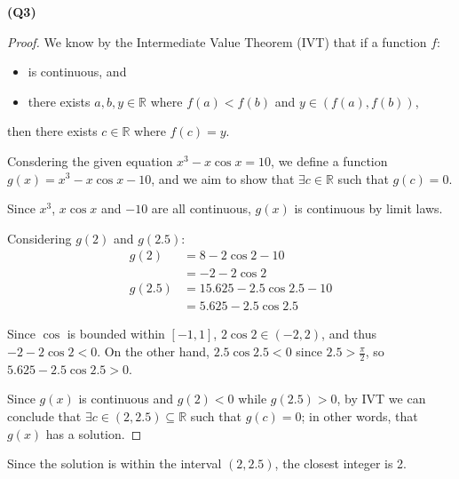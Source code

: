 \documentclass[12pt, a4paper]{article}
\newcommand{\R}{\mathbb{R}}
\begin{document}
\textbf{(Q3)} 
\begin{proof}
    We know by the Intermediate Value Theorem (IVT) that if a function $f$:
    \begin{itemize}
        \item is continuous, and
        \item there exists $a,b, y\in \R$ where $f(a) < f(b)$ and $y \in (f(a), f(b))$,
    \end{itemize}

    then there exists $c \in \R$ where $f(c) = y$.

    Consdering the given equation $x^3 - x \cos x = 10$, we define a function
    $g(x) = x^3 - x \cos x - 10$, and we aim to show that $\exists c \in \R$ such that $g(c) = 0$.

    Since $x^3$, $x \cos x$ and $-10$ are all continuous, $g(x)$ is continuous by limit laws.

    Considering $g(2)$ and $g(2.5)$:
    \begin{align*}
        g(2) & = 8 - 2 \cos 2 - 10\\
        & = -2 - 2 \cos 2\\
        g(2.5) & = 15.625 - 2.5 \cos 2.5 - 10\\
        & = 5.625 - 2.5 \cos 2.5
    \end{align*}

    Since $\cos$ is bounded within $[-1, 1]$, $2 \cos 2 \in (-2, 2)$, and thus $-2 -2 \cos 2 < 0$.
    On the other hand, $2.5 \cos 2.5 < 0$ since $2.5 > \frac{\pi}{2}$, so $5.625 - 2.5 \cos 2.5 > 0$.

    Since $g(x)$ is continuous and $g(2) < 0$ while $g(2.5) > 0$, by IVT we can conclude that
    $\exists c \in (2, 2.5) \subseteq \R$ such that $g(c) = 0$; in other words, that $g(x)$ has a solution.
\end{proof}

Since the solution is within the interval $(2, 2.5)$, the closest integer is 2.
\end{document}
